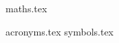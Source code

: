 \newcommand*{\phdtitle} {My Thesis Title}
\newcommand*{\phdauthor}{John Doe}
\newcommand*{\phddate}  {January 2021}




{maths.tex}

{acronyms.tex}
{symbols.tex}
\glsaddall{}
